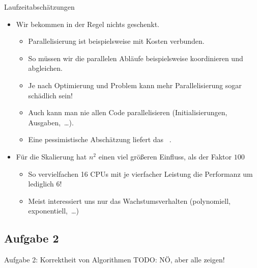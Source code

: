 {\iffull
{\AddonFrame
\begin{frame}{Laufzeitabschätzungen}
    \begin{itemize}[<+(1)->]
        \itemsep16pt
        \item Wir bekommen in der Regel  nichts geschenkt.
        \begin{itemize}
            \itemsep3.5pt
            \item Parallelisierung ist beispielsweise mit Kosten verbunden.
            \item So müssen wir die parallelen Abläufe beispielsweise koordinieren und abgleichen.
            \item Je nach Optimierung und Problem kann mehr Parallelisierung sogar schädlich sein!
            \item Auch kann man nie allen Code parallelisieren (Initialisierungen, Ausgaben,~\ldots).
            \item Eine pessimistische Abschätzung liefert das ~.
        \end{itemize}
        \item Für die Skalierung hat \(n^2\) einen viel größeren Einfluss, als der Faktor \(100\) \begin{itemize}
            \itemsep3.5pt
            \item So vervielfachen 16 CPUs mit je vierfacher Leistung die Performanz um lediglich \(6\)!
            \item Meist interessiert uns nur das Wachstumsverhalten (polynomiell, exponentiell,~\ldots)
        \end{itemize}
    \end{itemize}
\end{frame}}
\fi
}

\subsection{Aufgabe 2}
\begin{frame}{Aufgabe 2: Korrektheit von Algorithmen}
TODO: NÖ, aber alle zeigen!
\end{frame}
\iffalse
